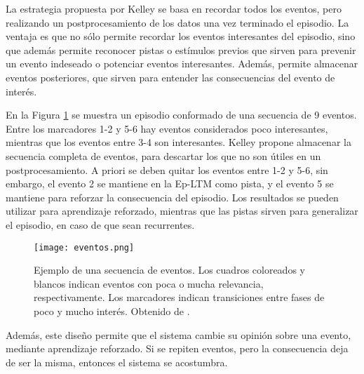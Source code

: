 La estrategia propuesta por Kelley se basa en recordar todos los eventos, pero realizando un postprocesamiento de los datos una vez terminado el episodio. La ventaja es que no sólo permite recordar los eventos interesantes del episodio, sino que además permite reconocer pistas o estímulos previos que sirven para prevenir un evento indeseado o potenciar eventos interesantes. Además, permite almacenar eventos posteriores, que sirven para entender las consecuencias del evento de interés. 

En la Figura \ref{img:sleep_eventos} se muestra un episodio conformado de una secuencia de 9 eventos. Entre los marcadores 1-2 y 5-6 hay eventos considerados poco interesantes, mientras que los eventos entre 3-4 son interesantes. Kelley propone almacenar la secuencia completa de eventos, para descartar los que no son útiles en un postprocesamiento. A priori se deben quitar los eventos entre 1-2 y 5-6, sin embargo, el evento 2 se mantiene en la Ep-LTM como pista, y el evento 5 se mantiene para reforzar la consecuencia del episodio. Los resultados se pueden utilizar para aprendizaje reforzado, mientras que las pistas sirven para generalizar el episodio, en caso de que sean recurrentes.

\begin{figure}[H]
	\centering
	\texttt{[image: eventos.png]}
	\caption{\small Ejemplo de una secuencia de eventos. Los cuadros coloreados y blancos indican eventos con poca o mucha relevancia, respectivamente. Los marcadores indican transiciones entre fases de poco y mucho interés. Obtenido de \cite{Kelley2014}.}
	\label{img:sleep_eventos}
\end{figure}







Además, este diseño permite que el sistema cambie su opinión sobre una evento, mediante aprendizaje reforzado. Si se repiten eventos, pero la consecuencia deja de ser la misma, entonces el sistema se acostumbra.

%

